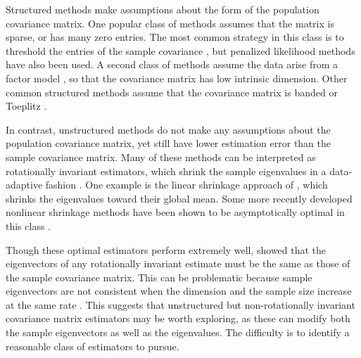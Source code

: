 \documentclass[useAMS,referee,usenatbib]{biom}
\begin{document}
Structured methods make assumptions about the form of the population covariance matrix. One popular class of methods assumes that the matrix is sparse, or has many zero entries. The most common strategy in this class is to threshold the entries of the sample covariance \citep{rothman2009generalized, cai2011adaptive}, but penalized likelihood methods \citep{xue2012positive} have also been used. A second class of methods assume the data arise from a factor model \citep{fan2008high}, so that the covariance matrix has low intrinsic dimension. Other common structured methods assume that the covariance matrix is banded \citep{li2017estimation} or Toeplitz \citep{liu2017covariance}.

In contrast, unstructured methods do not make any assumptions about the population covariance matrix, yet still have lower estimation error than the sample covariance matrix. Many of these methods can be interpreted as rotationally invariant estimators, which shrink the sample eigenvalues in a data-adaptive fashion \citep{bun2016rotational, stein1975estimation, stein1986lectures}. One example is the linear shrinkage approach of \citet{ledoit2004well}, which shrinks the eigenvalues toward their global mean. Some more recently developed nonlinear shrinkage methods have been shown to be asymptotically optimal in this class \citep{ledoit2012nonlinear, ledoit2019quadratic, lam2016nonparametric}.

Though these optimal estimators perform extremely well, \citet{bun2016rotational} showed that the eigenvectors of any rotationally invariant estimate must be the same as those of the sample covariance matrix. This can be problematic because sample eigenvectors are not consistent when the dimension and the sample size increase at the same rate \citep{mestre2008asymptotic}. This suggests that unstructured but non-rotationally invariant covariance matrix estimators may be worth exploring, as these can modify both the sample eigenvectors as well as the eigenvalues. The difficulty is to identify a reasonable class of estimators to pursue.

\end{document}
